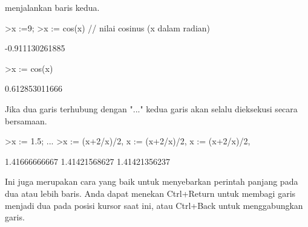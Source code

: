 \documentclass[a4paper,10pt]{article}
\begin{document}
\begin{eulernotebook}
\begin{eulercomment}
\begin{eulercomment}
\begin{eulercomment}
menjalankan baris kedua.
\end{eulercomment}
\begin{eulerprompt}
>x :=9; 
>x := cos(x) // nilai cosinus (x dalam radian)
\end{eulerprompt}
\begin{euleroutput}
  -0.911130261885
\end{euleroutput}
\begin{eulerprompt}
>x := cos(x)
\end{eulerprompt}
\begin{euleroutput}
  0.612853011666
\end{euleroutput}
\begin{eulercomment}
Jika dua garis terhubung dengan "..." kedua garis akan selalu
dieksekusi secara bersamaan.
\end{eulercomment}
\begin{eulerprompt}
>x := 1.5; ...
>x := (x+2/x)/2, x := (x+2/x)/2, x := (x+2/x)/2, 
\end{eulerprompt}
\begin{euleroutput}
  1.41666666667
  1.41421568627
  1.41421356237
\end{euleroutput}
\begin{eulercomment}
Ini juga merupakan cara yang baik untuk menyebarkan perintah panjang
pada dua atau lebih baris. Anda dapat menekan Ctrl+Return untuk
membagi garis menjadi dua pada posisi kursor saat ini, atau Ctrl+Back
untuk menggabungkan garis.


\end{eulercomment}
\end{eulercomment}
\end{eulercomment}
\end{eulernotebook}
\end{document}

